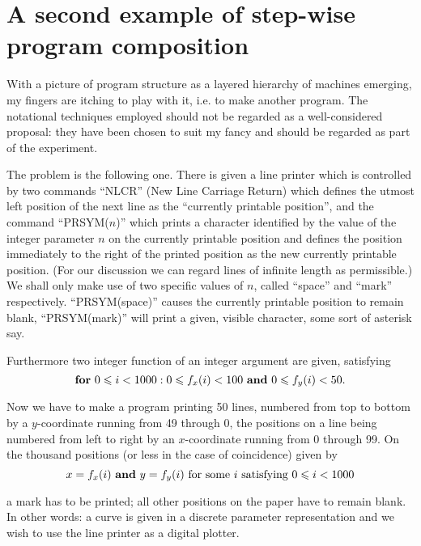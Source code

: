 \section{A second example of step-wise program composition}

With a picture of program structure as a layered hierarchy of machines emerging, my fingers are itching to play with it, i.e. to make another program. The notational techniques employed should not be regarded as a well-considered proposal: they have been chosen to suit my fancy and should be regarded as part of the experiment.

The problem is the following one. There is given a line printer which is controlled by two commands ``NLCR'' (New Line Carriage Return) which defines the utmost left position of the next line as the ``currently printable position'', and the command ``PRSYM($n$)'' which prints a character identified by the value of the integer parameter $n$ on the currently printable position and defines the position immediately to the right of the printed position as the new currently printable position. (For our discussion we can regard lines of infinite length as permissible.) We shall only make use of two specific values of $n$, called ``space'' and ``mark'' respectively. ``PRSYM(space)'' causes the currently printable position to remain blank, ``PRSYM(mark)'' will print a given, visible character, some sort of asterisk say.

Furthermore two integer function of an integer argument are given, satisfying
$$
\text{\textbf{for} } 0 \leqslant i < 1000 : 0 \leqslant f_x(i) < 100 \text{ \textbf{and} } 0 \leqslant f_y(i) < 50.
$$

Now we have to make a program printing 50 lines, numbered from top to bottom by a $y$-coordinate running from 49 through 0, the positions on a line being numbered from left to right by an $x$-coordinate running from 0 through 99. On the thousand positions (or less in the case of coincidence) given by
$$
x = f_x(i) \text{ \textbf{and} } y = f_y(i) \text{ for some } i \text{ satisfying } 0 \leqslant i < 1000
$$

\noindent
a mark has to be printed; all other positions on the paper have to remain blank. In other words: a curve is given in a discrete parameter representation and we wish to use the line printer as a digital plotter.

